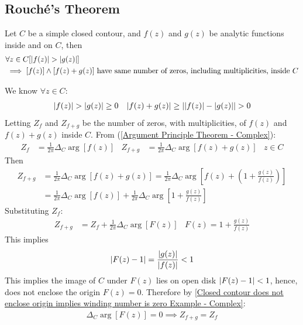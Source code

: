 \documentclass[12pt, english]{book}
\makeatletter
\renewenvironment{proof}[1][\proofname]{\par
	\pushQED{\qed}%
	\normalfont \topsep6\p@\@plus6\p@\relax
	\list{}{%
		\settowidth{\leftmargin}{\itshape\proofname:\hskip\labelsep}%
		\setlength{\labelwidth}{0pt}%
		\setlength{\itemindent}{-\leftmargin}%
	}%
	\item[\hskip\labelsep\itshape#1\@addpunct{:}]\ignorespaces
	}{ \popQED\endlist\@endpefalse}
\makeatother
\begin{document}
	\subsection{Rouché's Theorem} \label{Rouche's Theorem Subsection - Complex}
	
	\begin{theorem}
		\label{Rouche's Theorem - Complex}
		Let \(C\) be a simple closed contour, and \(f(z)\) and \(g(z)\) be analytic functions inside and on \(C\), then
		\begin{align*}
			&\forall z \in C [\abs{f(z)} > \abs{g(z)}] \\
			&\implies [f(z)] \land [f(z) + g(z)] \text{ have same number of zeros, including multiplicities, inside } C
		\end{align*}
	\end{theorem}
	\begin{proof}
		We know \(\forall z \in C\):
		\begin{align*}
			\abs{f(z)} &> \abs{g(z)} \geq 0	&
			\abs{f(z) + g(z)} \geq \abs{\abs{f(z)} - \abs{g(z)}} > 0
		\end{align*}
		Letting \(Z_f\) and \(Z_{f+g}\) be the number of zeros, with multiplicities, of \(f(z)\) and \(f(z) + g(z)\) inside \(C\). From (\cref{Argument Principle Theorem - Complex}):
		\begin{align*}
			Z_f &= \frac{1}{2\pi} \Delta_{C} \arg[f(z)] &
			Z_{f+g} &= \frac{1}{2\pi} \Delta_{C} \arg[f(z) + g(z)] & z \in C
		\end{align*}
		Then
		\begin{align*}
			Z_{f+g} &= \frac{1}{2\pi} \Delta_{C} \arg[f(z) + g(z)] 
				= \frac{1}{2\pi} \Delta_{C} \arg\left[f(z) + \left(1 + \frac{g(z)}{f(z)}\right)\right] \\
				&= \frac{1}{2\pi} \Delta_{C} \arg[f(z)] + \frac{1}{2\pi} \Delta_{C} \arg\left[1 + \frac{g(z)}{f(z)}\right]
		\end{align*}
		Substituting \(Z_f\):
		\begin{align*}
			Z_{f+g} &= Z_f + \frac{1}{2\pi} \Delta_{C} \arg[F(z)] &
				F(z) = 1 + \frac{g(z)}{f(z)}
		\end{align*}
		This implies 
		\begin{align*}
			\abs{F(z) - 1} = \frac{\abs{g(z)}}{\abs{f(z)}} < 1
		\end{align*}
		This implies the image of \(C\) under \(F(z)\) lies on open disk \(\abs{F(z) - 1} < 1\), hence, does not enclose the origin \(F(z) = 0\). Therefore by \cref{Closed contour does not enclose origin implies winding number is zero Example - Complex}:
		\begin{align*}
			\Delta_{C} \arg[F(z)] = 0 \implies Z_{f+g} = Z_f
		\end{align*}
	\end{proof}
	
\end{document}
